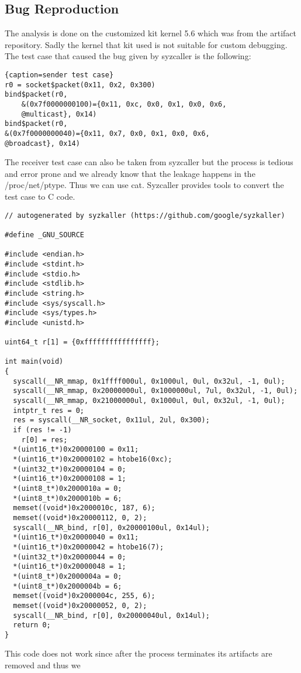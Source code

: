 \documentclass[10pt,twocolumn,a4paper]{article}
\begin{document}
\subsection{Bug Reproduction}
The analysis is done on the customized kit kernel 5.6 which was from the artifact repository\cite{2}.
Sadly the kernel that kit used is not suitable for custom debugging.
The test case that caused the bug given by syzcaller is the following: 
\begin{lstlisting}{caption=sender test case}
r0 = socket$packet(0x11, 0x2, 0x300)
bind$packet(r0, 
    &(0x7f0000000100)={0x11, 0xc, 0x0, 0x1, 0x0, 0x6,
    @multicast}, 0x14)
bind$packet(r0, 
&(0x7f0000000040)={0x11, 0x7, 0x0, 0x1, 0x0, 0x6,
@broadcast}, 0x14)
\end{lstlisting}
The receiver test case can also be taken from syzcaller but the process is tedious and error prone and
we already know that the leakage happens in the /proc/net/ptype. Thus we can use cat.
Syzcaller provides tools to convert the test case to C code. 
\begin{lstlisting}
// autogenerated by syzkaller (https://github.com/google/syzkaller)

#define _GNU_SOURCE

#include <endian.h>
#include <stdint.h>
#include <stdio.h>
#include <stdlib.h>
#include <string.h>
#include <sys/syscall.h>
#include <sys/types.h>
#include <unistd.h>

uint64_t r[1] = {0xffffffffffffffff};

int main(void)
{
  syscall(__NR_mmap, 0x1ffff000ul, 0x1000ul, 0ul, 0x32ul, -1, 0ul);
  syscall(__NR_mmap, 0x20000000ul, 0x1000000ul, 7ul, 0x32ul, -1, 0ul);
  syscall(__NR_mmap, 0x21000000ul, 0x1000ul, 0ul, 0x32ul, -1, 0ul);
  intptr_t res = 0;
  res = syscall(__NR_socket, 0x11ul, 2ul, 0x300);
  if (res != -1)
    r[0] = res;
  *(uint16_t*)0x20000100 = 0x11;
  *(uint16_t*)0x20000102 = htobe16(0xc);
  *(uint32_t*)0x20000104 = 0;
  *(uint16_t*)0x20000108 = 1;
  *(uint8_t*)0x2000010a = 0;
  *(uint8_t*)0x2000010b = 6;
  memset((void*)0x2000010c, 187, 6);
  memset((void*)0x20000112, 0, 2);
  syscall(__NR_bind, r[0], 0x20000100ul, 0x14ul);
  *(uint16_t*)0x20000040 = 0x11;
  *(uint16_t*)0x20000042 = htobe16(7);
  *(uint32_t*)0x20000044 = 0;
  *(uint16_t*)0x20000048 = 1;
  *(uint8_t*)0x2000004a = 0;
  *(uint8_t*)0x2000004b = 6;
  memset((void*)0x2000004c, 255, 6);
  memset((void*)0x20000052, 0, 2);
  syscall(__NR_bind, r[0], 0x20000040ul, 0x14ul);
  return 0;
}
\end{lstlisting}
This code does not work since after the process terminates its artifacts are removed and thus we
\end{document}
